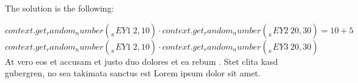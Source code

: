 The solution is the following:
\begin{Solution}
\solitem ${{context.get_random_number(__KEY1__, 2, 10)}} \cdot {{context.get_random_number(__KEY2__, 20, 30)}} = {{10+5}}$
\solitem ${{context.get_random_number(__KEY1__, 2, 10)}} \cdot {{context.get_random_number(__KEY3__, 20, 30)}}$ 
\solitem At vero eos et accusam et justo duo dolores et ea rebum . Stet clita kasd gubergren, no sea takimata sanctus est Lorem ipsum dolor sit amet. 
\end{Solution}